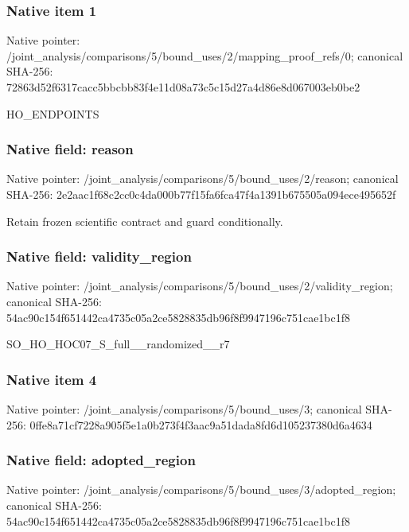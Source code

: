 \documentclass[10pt,a4paper]{article}
\begin{document}
\subsubsection{Native item 1}
Native pointer: /joint\_\allowbreak{}analysis/comparisons/5/bound\_\allowbreak{}uses/2/mapping\_\allowbreak{}proof\_\allowbreak{}refs/0; canonical SHA-256: 72863d52f6317cacc5bbcbb83f4e11d08a73c5c15d27a4d86e8d067003eb0be2

\begingroup\raggedright\sloppy HO\_\allowbreak{}ENDPOINTS\par\endgroup

\subsubsection{Native field: reason}
Native pointer: /joint\_\allowbreak{}analysis/comparisons/5/bound\_\allowbreak{}uses/2/reason; canonical SHA-256: 2e2aac1f68c2cc0c4da000b77f15fa6fca47f4a1391b675505a094ece495652f

\begingroup\raggedright\sloppy Retain frozen scientific contract and guard conditionally.\par\endgroup

\subsubsection{Native field: validity\_\allowbreak{}region}
Native pointer: /joint\_\allowbreak{}analysis/comparisons/5/bound\_\allowbreak{}uses/2/validity\_\allowbreak{}region; canonical SHA-256: 54ac90c154f651442ca4735c05a2ce5828835db96f8f9947196c751cae1bc1f8

\begingroup\raggedright\sloppy SO\_\allowbreak{}HO\_\allowbreak{}HOC07\_\allowbreak{}S\_\allowbreak{}full\_\allowbreak{}\_\allowbreak{}randomized\_\allowbreak{}\_\allowbreak{}r7\par\endgroup

\subsubsection{Native item 4}
Native pointer: /joint\_\allowbreak{}analysis/comparisons/5/bound\_\allowbreak{}uses/3; canonical SHA-256: 0ffe8a71cf7228a905f5e1a0b273f4f3aac9a51dada8fd6d105237380d6a4634

\subsubsection{Native field: adopted\_\allowbreak{}region}
Native pointer: /joint\_\allowbreak{}analysis/comparisons/5/bound\_\allowbreak{}uses/3/adopted\_\allowbreak{}region; canonical SHA-256: 54ac90c154f651442ca4735c05a2ce5828835db96f8f9947196c751cae1bc1f8
\end{document}
